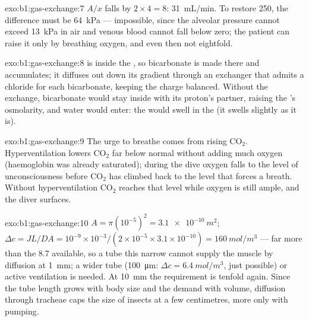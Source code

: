 \begin{solution}{exo:b1:gas-exchange:7}
$A/x$ falls by $2\times 4 = 8$: \qty{31}{mL/min}. To restore
\qty{250}{}, the difference must be \qty{64}{kPa} --- impossible, since
the alveolar pressure cannot exceed \qty{13}{kPa} in air and venous
blood cannot fall below zero; the patient can raise it only by
breathing oxygen, and even then not eightfold.
\end{solution}

\begin{solution}{exo:b1:gas-exchange:8}
 is inside the , so bicarbonate is made there
and accumulates; it diffuses out down its gradient through an
exchanger that admits a chloride for each bicarbonate, keeping the
charge balanced. Without the exchange, bicarbonate would stay inside
with its proton's partner, raising the 's osmolarity, and water
would enter: the  would swell in the  (it swells slightly
as it is).
\end{solution}

\begin{solution}{exo:b1:gas-exchange:9}
The urge to breathe comes from rising $\mathrm{CO_2}$. Hyperventilation
lowers $\mathrm{CO_2}$ far below normal without adding much oxygen
(haemoglobin was already saturated); during the dive oxygen falls to
the level of unconsciousness before $\mathrm{CO_2}$ has climbed back to
the level that forces a breath. Without hyperventilation
$\mathrm{CO_2}$ reaches that level while oxygen is still ample, and the
diver surfaces.
\end{solution}

\begin{solution}{exo:b1:gas-exchange:10}
$A = \pi(10^{-5})^2 = \qty{3.1e-10}{m^2}$; $\Delta c = JL/DA =
10^{-9}\times 10^{-3}/(2\times 10^{-5}\times 3.1\times 10^{-10}) =
\qty{160}{mol/m^3}$ --- far more than the \qty{8.7}{} available, so a
tube this narrow cannot supply the muscle by diffusion at \qty{1}{mm};
a wider tube (\qty{100}{\micro m}: $\Delta c = \qty{6.4}{mol/m^3}$, just
possible) or active ventilation is needed. At \qty{10}{mm} the
requirement is tenfold again. Since the tube length grows with body
size and the demand with volume, diffusion through tracheae caps the
size of insects at a few centimetres, more only with pumping.
\end{solution}

